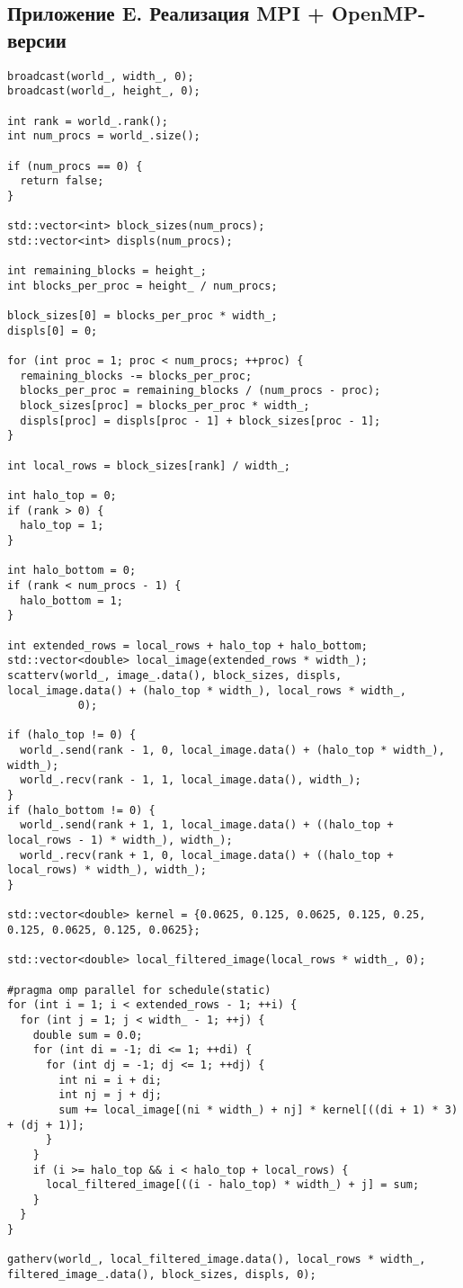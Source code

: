\documentclass[14pt, a4paper]{extarticle}
\begin{document}
\subsection*{Приложение E. Реализация MPI + OpenMP-версии}
\begin{lstlisting}
broadcast(world_, width_, 0);
broadcast(world_, height_, 0);

int rank = world_.rank();
int num_procs = world_.size();

if (num_procs == 0) {
  return false;
}

std::vector<int> block_sizes(num_procs);
std::vector<int> displs(num_procs);

int remaining_blocks = height_;
int blocks_per_proc = height_ / num_procs;

block_sizes[0] = blocks_per_proc * width_;
displs[0] = 0;

for (int proc = 1; proc < num_procs; ++proc) {
  remaining_blocks -= blocks_per_proc;
  blocks_per_proc = remaining_blocks / (num_procs - proc);
  block_sizes[proc] = blocks_per_proc * width_;
  displs[proc] = displs[proc - 1] + block_sizes[proc - 1];
}

int local_rows = block_sizes[rank] / width_;

int halo_top = 0;
if (rank > 0) {
  halo_top = 1;
}

int halo_bottom = 0;
if (rank < num_procs - 1) {
  halo_bottom = 1;
}

int extended_rows = local_rows + halo_top + halo_bottom;
std::vector<double> local_image(extended_rows * width_);
scatterv(world_, image_.data(), block_sizes, displs, local_image.data() + (halo_top * width_), local_rows * width_,
           0);

if (halo_top != 0) {
  world_.send(rank - 1, 0, local_image.data() + (halo_top * width_), width_);
  world_.recv(rank - 1, 1, local_image.data(), width_);
}
if (halo_bottom != 0) {
  world_.send(rank + 1, 1, local_image.data() + ((halo_top + local_rows - 1) * width_), width_);
  world_.recv(rank + 1, 0, local_image.data() + ((halo_top + local_rows) * width_), width_);
}

std::vector<double> kernel = {0.0625, 0.125, 0.0625, 0.125, 0.25, 0.125, 0.0625, 0.125, 0.0625};

std::vector<double> local_filtered_image(local_rows * width_, 0);

#pragma omp parallel for schedule(static)
for (int i = 1; i < extended_rows - 1; ++i) {
  for (int j = 1; j < width_ - 1; ++j) {
    double sum = 0.0;
    for (int di = -1; di <= 1; ++di) {
      for (int dj = -1; dj <= 1; ++dj) {
        int ni = i + di;
        int nj = j + dj;
        sum += local_image[(ni * width_) + nj] * kernel[((di + 1) * 3) + (dj + 1)];
      }
    }
    if (i >= halo_top && i < halo_top + local_rows) {
      local_filtered_image[((i - halo_top) * width_) + j] = sum;
    }
  }
}

gatherv(world_, local_filtered_image.data(), local_rows * width_, filtered_image_.data(), block_sizes, displs, 0);
\end{lstlisting}
\end{document}
